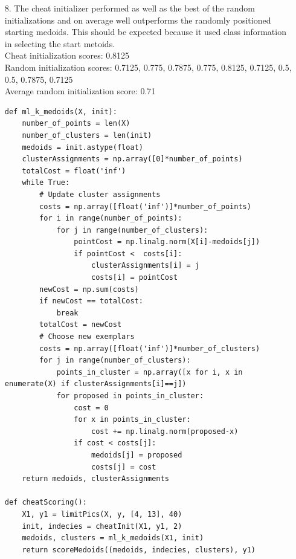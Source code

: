 \documentclass{article}
\begin{document}
\begin{enumerate}
\newpage

\item[8.]
	The cheat initializer performed as well as the best of the random initializations and on average well outperforms the randomly positioned starting medoids. This should be expected because it used class information in selecting the start metoids.\\
	
	Cheat initialization scores: 0.8125\\
	Random initialization scores: 0.7125, 0.775, 0.7875, 0.775, 0.8125, 0.7125, 0.5, 0.5, 0.7875, 0.7125\\
	
	Average random initialization score: 0.71\\

\newpage

\begin{lstlisting}   
def ml_k_medoids(X, init):
    number_of_points = len(X)
    number_of_clusters = len(init)
    medoids = init.astype(float)
    clusterAssignments = np.array([0]*number_of_points)
    totalCost = float('inf')
    while True:         
        # Update cluster assignments
        costs = np.array([float('inf')]*number_of_points)
        for i in range(number_of_points):
            for j in range(number_of_clusters):
                pointCost = np.linalg.norm(X[i]-medoids[j])
                if pointCost <  costs[i]:
                    clusterAssignments[i] = j
                    costs[i] = pointCost                                   
        newCost = np.sum(costs)
        if newCost == totalCost:
            break
        totalCost = newCost                                          
        # Choose new exemplars    
        costs = np.array([float('inf')]*number_of_clusters)                      
        for j in range(number_of_clusters):
            points_in_cluster = np.array([x for i, x in enumerate(X) if clusterAssignments[i]==j])
            for proposed in points_in_cluster:
                cost = 0
                for x in points_in_cluster:
                    cost += np.linalg.norm(proposed-x)
                if cost < costs[j]:
                    medoids[j] = proposed
                    costs[j] = cost     
    return medoids, clusterAssignments
    
def cheatScoring():
    X1, y1 = limitPics(X, y, [4, 13], 40)
    init, indecies = cheatInit(X1, y1, 2)
    medoids, clusters = ml_k_medoids(X1, init)
    return scoreMedoids((medoids, indecies, clusters), y1)
    

\end{lstlisting}
\end{enumerate}
\end{document}
